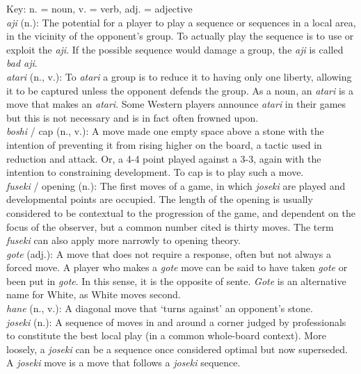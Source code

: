 \documentclass[a5paper,12pt,twoside]{book} %
\newcounter{joseki}                 %
\begin{document}
\noindent Key: n. = noun, v. = verb, adj. = adjective\\

\noindent \textit{aji} (n.): The potential for a player to play a sequence or sequences in a local area, in the vicinity of the opponent's group. To actually play the sequence is to use or exploit the \textit{aji}. If the possible sequence would damage a group, the \textit{aji­} is called \textit{bad aji}.\\

\noindent \textit{atari} (n., v.): To \textit{atari} a group is to reduce it to having only one liberty, allowing it to be captured unless the opponent defends the group. As a noun, an \textit{atari} is a move that makes an \textit{atari}. Some Western players announce \textit{atari} in their games but this is not necessary and is in fact often frowned upon.\\

\noindent \textit{boshi} / cap (n., v.): A move made one empty space above a stone with the intention of preventing it from rising higher on the board, a tactic used in reduction and attack. Or, a 4-4 point played against a 3-3, again with the intention to constraining development. To cap is to play such a move.\\

\noindent \textit{fuseki} / opening (n.): The first moves of a game, in which \textit{joseki} are played and developmental points are occupied. The length of the opening is usually considered to be contextual to the progression of the game, and dependent on the focus of the observer, but a common number cited is thirty moves. The term \textit{fuseki} can also apply more narrowly to opening theory.\\

\noindent \textit{gote} (adj.): A move that does not require a response, often but not always a forced move. A player who makes a \textit{gote} move can be said to have taken \textit{gote} or been put in \textit{gote}. In this sense, it is the opposite of sente. \textit{Gote} is an alternative name for White, as White moves second.\\

\noindent \textit{hane} (n., v.): A diagonal move that `turns against' an opponent's stone.\\

\noindent \textit{joseki} (n.): A sequence of moves in and around a corner judged by professionals to constitute the best local play (in a common whole-board context). More loosely, a \textit{joseki} can be a sequence once considered optimal but now superseded. A \textit{joseki} move is a move that follows a \textit{joseki} sequence.\\
\end{document}
